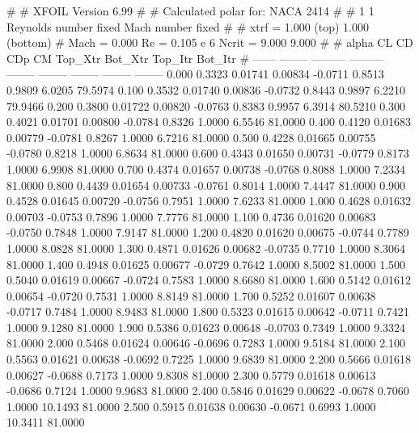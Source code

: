 #  
#       XFOIL         Version 6.99
#  
# Calculated polar for: NACA 2414                                       
#  
# 1 1 Reynolds number fixed          Mach number fixed         
#  
# xtrf =   1.000 (top)        1.000 (bottom)  
# Mach =   0.000     Re =     0.105 e 6     Ncrit =   9.000  9.000
#  
#   alpha    CL        CD       CDp       CM     Top_Xtr  Bot_Xtr  Top_Itr  Bot_Itr
#  ------ -------- --------- --------- -------- -------- -------- -------- --------
   0.000   0.3323   0.01741   0.00834  -0.0711   0.8513   0.9809   6.0205  79.5974
   0.100   0.3532   0.01740   0.00836  -0.0732   0.8443   0.9897   6.2210  79.9466
   0.200   0.3800   0.01722   0.00820  -0.0763   0.8383   0.9957   6.3914  80.5210
   0.300   0.4021   0.01701   0.00800  -0.0784   0.8326   1.0000   6.5546  81.0000
   0.400   0.4120   0.01683   0.00779  -0.0781   0.8267   1.0000   6.7216  81.0000
   0.500   0.4228   0.01665   0.00755  -0.0780   0.8218   1.0000   6.8634  81.0000
   0.600   0.4343   0.01650   0.00731  -0.0779   0.8173   1.0000   6.9908  81.0000
   0.700   0.4374   0.01657   0.00738  -0.0768   0.8088   1.0000   7.2334  81.0000
   0.800   0.4439   0.01654   0.00733  -0.0761   0.8014   1.0000   7.4447  81.0000
   0.900   0.4528   0.01645   0.00720  -0.0756   0.7951   1.0000   7.6233  81.0000
   1.000   0.4628   0.01632   0.00703  -0.0753   0.7896   1.0000   7.7776  81.0000
   1.100   0.4736   0.01620   0.00683  -0.0750   0.7848   1.0000   7.9147  81.0000
   1.200   0.4820   0.01620   0.00675  -0.0744   0.7789   1.0000   8.0828  81.0000
   1.300   0.4871   0.01626   0.00682  -0.0735   0.7710   1.0000   8.3064  81.0000
   1.400   0.4948   0.01625   0.00677  -0.0729   0.7642   1.0000   8.5002  81.0000
   1.500   0.5040   0.01619   0.00667  -0.0724   0.7583   1.0000   8.6680  81.0000
   1.600   0.5142   0.01612   0.00654  -0.0720   0.7531   1.0000   8.8149  81.0000
   1.700   0.5252   0.01607   0.00638  -0.0717   0.7484   1.0000   8.9483  81.0000
   1.800   0.5323   0.01615   0.00642  -0.0711   0.7421   1.0000   9.1280  81.0000
   1.900   0.5386   0.01623   0.00648  -0.0703   0.7349   1.0000   9.3324  81.0000
   2.000   0.5468   0.01624   0.00646  -0.0696   0.7283   1.0000   9.5184  81.0000
   2.100   0.5563   0.01621   0.00638  -0.0692   0.7225   1.0000   9.6839  81.0000
   2.200   0.5666   0.01618   0.00627  -0.0688   0.7173   1.0000   9.8308  81.0000
   2.300   0.5779   0.01618   0.00613  -0.0686   0.7124   1.0000   9.9683  81.0000
   2.400   0.5846   0.01629   0.00622  -0.0678   0.7060   1.0000  10.1493  81.0000
   2.500   0.5915   0.01638   0.00630  -0.0671   0.6993   1.0000  10.3411  81.0000
